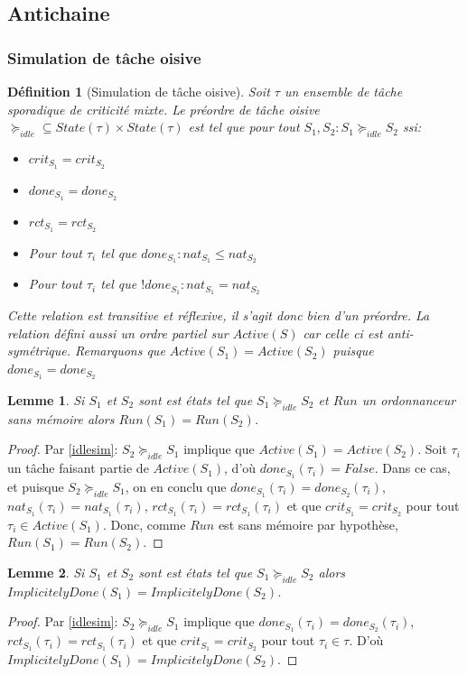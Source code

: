 \documentclass[a4paper]{report}
\theoremstyle{break}
\newtheorem{defin}{Définition}
\theoremstyle{breakplain}
\newtheorem{lem}{Lemme}
\begin{document}
\subsection{Antichaine}

\subsubsection{Simulation de tâche oisive}

\begin{defin}[Simulation de tâche oisive]
\label{idlesim}
Soit $\tau$ un ensemble de tâche sporadique de criticité mixte. Le préordre de tâche oisive $\succeq_{idle} \subseteq State(\tau)\times State(\tau)$ est tel que pour tout $S_1, S_2 : S_1 \succeq_{idle}S_2$ ssi:
\begin{itemize}
\item $crit_{S_1} = crit_{S_2}$
\item $done_{S_1} = done_{S_2}$
\item $rct_{S_1} = rct_{S_2}$
\item Pour tout $\tau_i$ tel que $done_{S_1} : nat_{S_1} \leq nat_{S_2}$
\item Pour tout $\tau_i$ tel que $!done_{S_1} : nat_{S_1} = nat_{S_2}$
\end{itemize}
Cette relation est transitive et réflexive, il s'agit donc bien d'un préordre. La relation défini aussi un ordre partiel sur $Active(S)$ car celle ci est anti-symétrique.
Remarquons que $Active(S_1) = Active (S_2)$ puisque $done_{S_1} = done_{S_2}$
\end{defin}

\begin{lem}
\label{runeq}
Si $S_1$ et $S_2$ sont est états tel que $S_1 \succeq_{idle}S_2$ et $Run$ un ordonnanceur sans mémoire alors $Run (S_1) = Run(S_2)$.
\end{lem}
\begin{proof} Par \autoref{idlesim}: $S_2 \succeq_{idle} S_1$ implique que $Active(S_1) = Active(S_2)$. Soit $\tau_i$ un tâche faisant partie de $Active(S_1)$, d'où $done_{S_1}(\tau_i) = False$. Dans ce cas, et puisque $S_2 \succeq_{idle} S_1$, on en conclu que $done_{S_1}(\tau_i) = done_{S_2}(\tau_i)$, $nat_{S_1}(\tau_i) = nat_{S_1}(\tau_i)$, $rct_{S_1}(\tau_i) = rct_{S_1}(\tau_i)$ et que $crit_{S_1} = crit_{S_2}$ pour tout $\tau_i \in Active(S_1)$. Donc, comme $Run$ est sans mémoire par hypothèse, $Run(S_1) = Run(S_2)$.
\end{proof}

\begin{lem}
\label{impdoneeq}
Si $S_1$ et $S_2$ sont est états tel que $S_1 \succeq_{idle}S_2$ alors $ImplicitelyDone(S_1) = ImplicitelyDone(S_2)$.
\end{lem}
\begin{proof} Par \autoref{idlesim}: $S_2 \succeq_{idle} S_1$ implique que $done_{S_1}(\tau_i) = done_{S_2}(\tau_i)$, $rct_{S_1}(\tau_i) = rct_{S_1}(\tau_i)$ et que $crit_{S_1} = crit_{S_2}$ pour tout $\tau_i \in \tau$. D'où $ImplicitelyDone(S_1) = ImplicitelyDone(S_2)$.
\end{proof}
\end{document}
